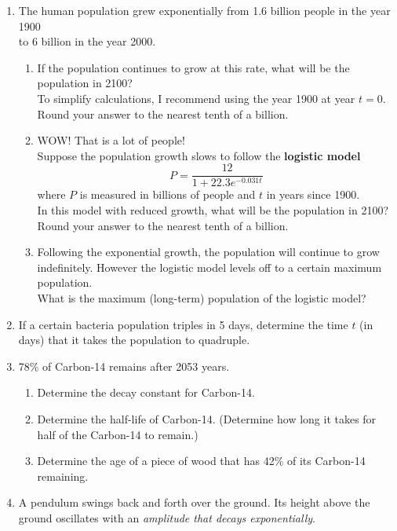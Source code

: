 \begin{enumerate}
\newpage
\item The human population grew exponentially from 1.6 billion people in the year 1900 \\ to 6 billion in the year 2000.
\begin{enumerate}
\item If the population continues to grow at this rate, what will be the population in 2100? \\ To simplify calculations, I recommend using the year 1900 at year $t=0$.  Round your answer to the nearest tenth of a billion. \vfill \vfill
\item WOW! That is a lot of people!  \\ Suppose the population growth slows to follow the \textbf{logistic model} $$P=\dfrac{12}{1+22.3e^{-0.031t}}$$  where $P$ is measured in billions of people and $t$ in years since 1900. \\ In this model with reduced growth, what will be the population in 2100?  Round your answer to the nearest tenth of a billion. \vfill
\item Following the exponential growth, the population will continue to grow indefinitely.  However the logistic model levels off to a certain maximum population.  \\ What is the maximum (long-term) population of the logistic model? \vfill
\end{enumerate} 



\newpage
\item If a certain bacteria population triples in 5 days, determine the time $t$ (in days) that it takes the population to quadruple.\vfill



\item 78\% of Carbon-14 remains after 2053 years.
\begin{enumerate}
\item Determine the decay constant for Carbon-14.\vfill
\item Determine the half-life of Carbon-14. (Determine how long it takes for half of the Carbon-14 to remain.)\vfill
\item Determine the age of a piece of wood that has 42\% of its Carbon-14 remaining.\vfill
\end{enumerate}


\newpage
\item A pendulum swings back and forth over the ground. Its height above the ground oscillates with an \emph{amplitude that decays exponentially}.


\end{enumerate}
